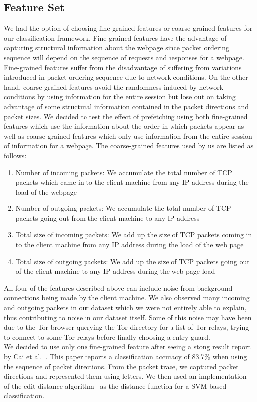 \subsection{Feature Set}
We had the option of choosing fine-grained features or coarse grained features for our classification framework. 
Fine-grained features have the advantage of capturing structural information about the webpage since packet ordering sequence will depend on the sequence of requests and responses for a webpage. 
Fine-grained features suffer from the disadvantage of suffering from variations introduced in packet ordering sequence due to network conditions. 
On the other hand, coarse-grained features avoid the randomness induced by network conditions by using information for the entire session but lose out on taking advantage of some structural information contained in the packet directions and packet sizes.
We decided to test the effect of prefetching using both fine-grained features which use the information about the order in which packets appear as well as coarse-grained features which only use information from the entire session of information for a webpage. The coarse-grained features used by us are listed as follows:
\begin{enumerate}
\item 
Number of incoming packets: We accumulate the total number of TCP packets which came in to the client machine from any IP address during the load of the webpage
\item
Number of outgoing packets: We accumulate the total number of TCP packets going out from the client machine to any IP address
\item 
Total size of incoming packets: We add up the size of TCP packets coming in to the client machine from any IP address during the load of the web page
\item
Total size of outgoing packets: We add up the size of TCP packets going out of the client machine to any IP address during the web page load
\end{enumerate}
All four of the features described above can include noise from background connections being made by the client machine. 
We also observed many incoming and outgoing packets in our dataset which we were not entirely able to explain, thus contributing to noise in our dataset itself. 
Some of this noise may have been due to the Tor browser querying the Tor directory for a list of Tor relays, trying to connect to some Tor relays before finally choosing a entry guard.\\
We decided to use only one fine-grained feature after seeing a stong result report by Cai et al.~\cite{cai2012touching}. This paper reports a classification accuracy of 83.7\% when using the sequence of packet directions. From the packet trace, we captured packet directions and represented them using letters. We then used an implementation~\cite{edit-distance-matlab} of the edit distance algorithm~\cite{edit-distance} as the distance function for a SVM-based classification.



